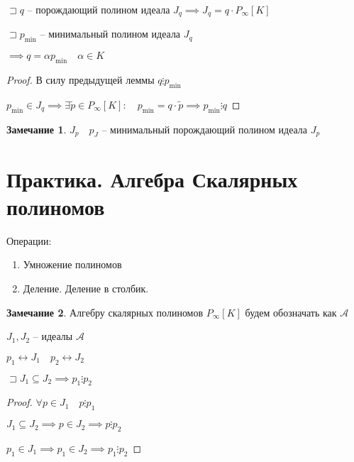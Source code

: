 \documentclass{book}
\newcommand{\tl}[1]{\widetilde{#1}}
\theoremstyle{definition}
\newtheorem*{note}{Замечание}
\begin{document}
\begin{lemma}
    $\sqsupset q$ -- порождающий полином идеала $J_q \implies J_q = q \cdot  P_{\infty }[K]$

    $\sqsupset p_{\min}$ -- минимальный полином идеала $J_q$ 

    $\implies q = \alpha  p_{\min}\quad \alpha \in K$
\end{lemma}
\begin{proof}
    В силу предыдущей леммы $q \vdots p_{\min}$

    $p_{\min} \in J_q \implies \exists \tl p\in P_{\infty }[K]:\quad p_{\min} = q \cdot  \tl p \implies  p_{\min}\vdots q$
\end{proof}

\begin{note}
    $J_p\quad p_J$ -- минимальный порождающий полином идеала  $J_p$
\end{note}

\section{Практика. Алгебра Скалярных полиномов}

Операции:
\begin{enumerate}
    \item Умножение полиномов
    \item Деление. Деление в столбик.
\end{enumerate}

\begin{note}
    Алгебру скалярных полиномов $P_{\infty }[K]$ будем обозначать как $\mathscr{A}$
\end{note}

\begin{lemma}
    $J_1, J_2$ -- идеалы $\mathscr{A}$

     $p_1 \leftrightarrow J_1\quad p_2 \leftrightarrow J_2$

     $\sqsupset J_1 \subseteq J_2 \implies p_1 \vdots p_2$
\end{lemma}
\begin{proof}
    $\forall p \in J_1\quad p\vdots p_1$

    $J_1 \subseteq  J_2 \implies  p\in J_2 \implies  p \vdots p_2$

    $p_1\in J_1 \implies  p_1 \in J_2 \implies  p_1 \vdots p_2$
\end{proof}
\end{document}
